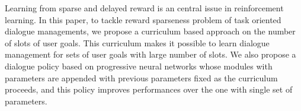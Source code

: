 Learning from sparse and delayed reward is an central issue in reinforcement learning. In this paper, to tackle reward sparseness problem of task oriented dialogue managements, we propose a curriculum based approach on the number of slots of user goals. This curriculum makes it possible to learn dialogue management for sets of user goals with large number of slots. We also propose a dialogue policy based on progressive neural networks whose modules with parameters are appended with previous parameters fixed as the curriculum proceeds, and this policy improves performances over the one with single set of parameters.
